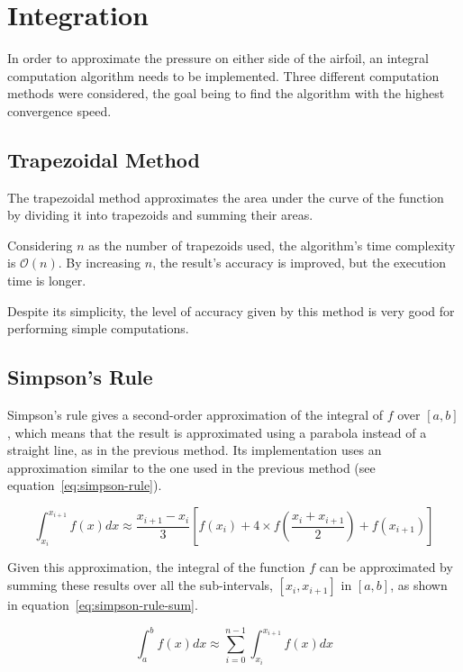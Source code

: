 \section{Integration }

In order to approximate the pressure on either side of the airfoil, an integral computation algorithm needs to be implemented.
Three different computation methods were considered, the goal being to find the algorithm with the highest convergence speed.


\subsection{Trapezoidal Method}

The trapezoidal method approximates the area under the curve of the function by dividing it into trapezoids and summing their areas.

Considering $n$ as the number of trapezoids used, the algorithm's time complexity is $\mathcal{O}(n)$.
By increasing $n$, the result's accuracy is improved, but the execution time is longer.

Despite its simplicity, the level of accuracy given by this method is very good for performing simple computations.


\subsection{Simpson's Rule}

Simpson's rule gives a second-order approximation of the integral of $f$ over $[a, b]$,
which means that the result is approximated using a parabola instead of a straight line, as in the previous method.
Its implementation uses an approximation similar to the one used in the previous method (see equation~\ref{eq:simpson-rule}).

\begin{equation}
	\label{eq:simpson-rule}
	\int_{x_i}^{x_{i + 1}} f(x) dx \approx \frac{x_{i + 1} - x_i}{3} \left[ f(x_i) + 4 \times f\left(\frac{x_i + x_{i + 1}}{2}\right) + f(x_{i + 1}) \right]
\end{equation}

Given this approximation, the integral of the function $f$ can be approximated by summing these results over all the sub-intervals,
$[x_i, x_{i + 1}]$ in $[a, b]$, as shown in equation~\ref{eq:simpson-rule-sum}.

\begin{equation}
	\label{eq:simpson-rule-sum}
	\int_a^b f(x) dx \approx \sum_{i = 0}^{n - 1} \int_{x_i}^{x_{i + 1}} f(x) dx
\end{equation}

